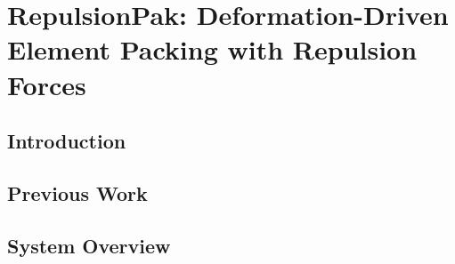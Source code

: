 
\newcommand{\simforce}[1]{\bm{F}_{\kern -0.02in #1}}

\chapter[RepulsionPak: Deformation-Driven Element Packing \newline with Repulsion Forces]
{RepulsionPak: Deformation-Driven Element Packing with Repulsion Forces}



\section{Introduction}
\label{repulsionpak_introduction}



\section{Previous Work}
\label{repulsionpak_previous_work}


\section{System Overview}
\label{repulsionpak_system_overview}




